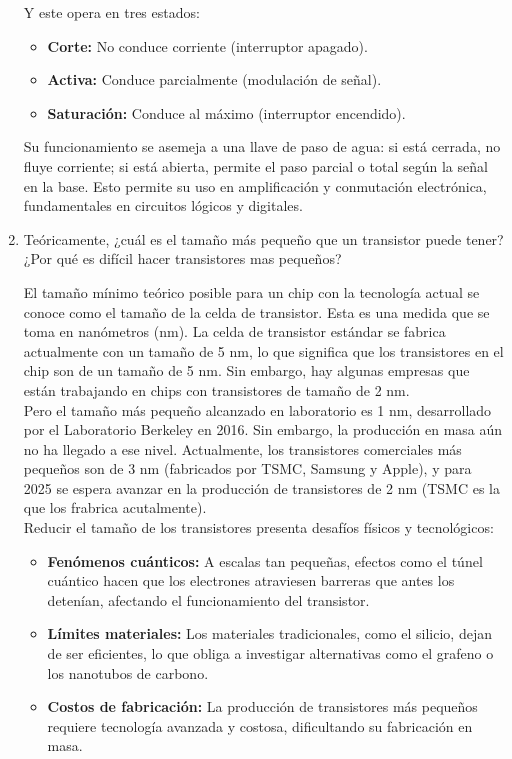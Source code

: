 \documentclass[12pt,letterpaper]{article}
\begin{document}
\begin{enumerate}
    Y este opera en tres estados:

    \begin{itemize}
    \item \textbf{Corte:} No conduce corriente (interruptor apagado).
    \item \textbf{Activa:} Conduce parcialmente (modulación de señal).
    \item \textbf{Saturación:} Conduce al máximo (interruptor encendido).
    \end{itemize}   

    Su funcionamiento se asemeja a una llave de paso de agua: si está cerrada, no fluye corriente; si está abierta, permite el paso parcial o total según la señal en la base. Esto permite su uso en amplificación y conmutación electrónica, fundamentales en circuitos lógicos y digitales.

    
  \item Teóricamente, ¿cuál es el tamaño más pequeño que un transistor puede tener? ¿Por qué es difícil hacer transistores mas pequeños?
    
    \bigskip
    El tamaño mínimo teórico posible para un chip con la tecnología actual se conoce como el tamaño de la celda de transistor. Esta es una medida que se toma en nanómetros (nm). La celda de transistor estándar se fabrica actualmente con un tamaño de 5 nm, lo que significa que los transistores en el chip son de un tamaño de 5 nm. Sin embargo, hay algunas empresas que están trabajando en chips con transistores de tamaño de 2 nm.\\
    Pero el tamaño más pequeño alcanzado en laboratorio es 1 nm, desarrollado por el Laboratorio Berkeley en 2016. Sin embargo, la producción en masa aún no ha llegado a ese nivel. Actualmente, los transistores comerciales más pequeños son de 3 nm (fabricados por TSMC, Samsung y Apple), y para 2025 se espera avanzar en la producción de transistores de 2 nm (TSMC es la que los frabrica acutalmente).\\

    Reducir el tamaño de los transistores presenta desafíos físicos y tecnológicos:
    \begin{itemize}
    \item \textbf{Fenómenos cuánticos:} A escalas tan pequeñas, efectos como el túnel cuántico hacen que los electrones atraviesen barreras que antes los detenían, afectando el funcionamiento del transistor.
    \item \textbf{Límites materiales:} Los materiales tradicionales, como el silicio, dejan de ser eficientes, lo que obliga a investigar alternativas como el grafeno o los nanotubos de carbono.
    \item \textbf{Costos de fabricación:} La producción de transistores más pequeños requiere tecnología avanzada y costosa, dificultando su fabricación en masa.
    \end{itemize}   
    

\end{enumerate}
\end{document}
